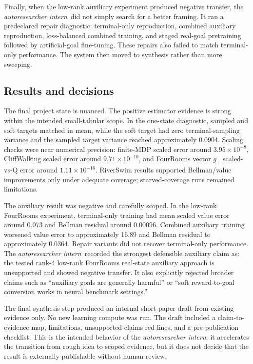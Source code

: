 \documentclass{article}
\newcommand{\intern}{\emph{autoresearcher intern}}
\begin{document}
Finally, when the low-rank auxiliary experiment produced negative transfer, the \intern\ did not simply search for a better framing. It ran a predeclared repair diagnostic: terminal-only reproduction, combined auxiliary reproduction, loss-balanced combined training, and staged real-goal pretraining followed by artificial-goal fine-tuning. These repairs also failed to match terminal-only performance. The system then moved to synthesis rather than more sweeping.

\subsection{Results and decisions}

The final project state is nuanced. The positive estimator evidence is strong within the intended small-tabular scope. In the one-state diagnostic, sampled and soft targets matched in mean, while the soft target had zero terminal-sampling variance and the sampled target variance reached approximately 0.0904. Scaling checks were near numerical precision: finite-MDP scaled error around \(3.95\times 10^{-8}\), CliffWalking scaled error around \(9.71\times 10^{-10}\), and FourRooms vector \(g_+\) scaled-vs-Q error around \(1.11\times 10^{-16}\). RiverSwim results supported Bellman/value improvements only under adequate coverage; starved-coverage runs remained limitations.

The auxiliary result was negative and carefully scoped. In the low-rank FourRooms experiment, terminal-only training had mean scaled value error around 0.073 and Bellman residual around 0.00096. Combined auxiliary training worsened value error to approximately 16.89 and Bellman residual to approximately 0.0364. Repair variants did not recover terminal-only performance. The \intern\ recorded the strongest defensible auxiliary claim as: the tested rank-4 low-rank FourRooms real-state auxiliary approach is unsupported and showed negative transfer. It also explicitly rejected broader claims such as ``auxiliary goals are generally harmful'' or ``soft reward-to-goal conversion works in neural benchmark settings.''

The final synthesis step produced an internal short-paper draft from existing evidence only. No new learning compute was run. The draft included a claim-to-evidence map, limitations, unsupported-claims red lines, and a pre-publication checklist. This is the intended behavior of the \intern: it accelerates the transition from rough idea to scoped evidence, but it does not decide that the result is externally publishable without human review.
\end{document}
